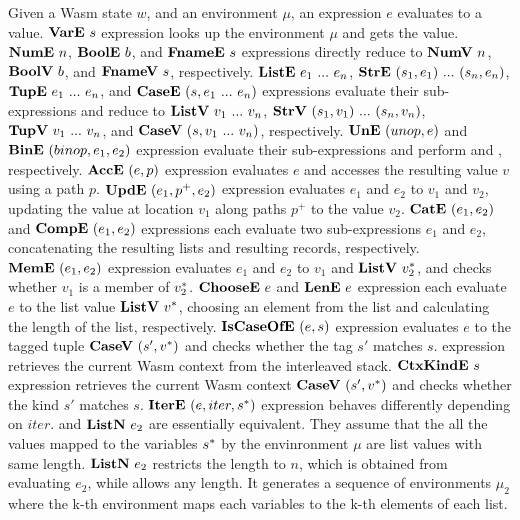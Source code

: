 Given a Wasm state $w$, and an environment $\mu$, an expression $e$ evaluates
to a value.
$\textbf{VarE} ~ s${} expression looks up the environment $\mu$ and gets the value.
$\textbf{NumE} ~ n${}, $\textbf{BoolE} ~ b${}, and $\textbf{FnameE} ~ s${} expressions directly reduce
to $\textbf{NumV} ~ n${}, $\textbf{BoolV} ~ b${}, and $\textbf{FnameV} ~ s${}, respectively.
$\textbf{ListE} ~ e_1 ~ ... ~ e_n${}, $\textbf{StrE} ~ (s_1, e_1) ~ ... ~ (s_n, e_n)${}, $\textbf{TupE}
~ e_1 ~ ... ~ e_n${}, and $\textbf{CaseE} ~ (s, e_1 ~ ... ~ e_n)${} expressions
evaluate their sub-expressions and reduce to $\textbf{ListV} ~ v_1 ~ ... ~ v_n${},
$\textbf{StrV} ~ (s_1, v_1) ~ ... ~ (s_n, v_n)${}, $\textbf{TupV} ~ v_1 ~ ... ~ v_n${}, and
$\textbf{CaseV} ~ (s, v_1 ~ ... ~ v_n)${}, respectively.
$\textbf{UnE} ~ (unop, e)${} and $\textbf{BinE} ~ (binop, e_1, e_2)${} expression evaluate
their sub-expressions and perform \unop{} and \binop{}, respectively.
$\textbf{AccE} ~ (e, p)${} expression evaluates $e$ and accesses the resulting value
$v$ using a path $p$.
$\textbf{UpdE} ~ (e_1, p^+, e_2)${} expression evaluates $e_1$ and $e_2$ to $v_1$ and
$v_2$, updating the value at location $v_1$ along paths $p^+$ to the value
$v_2$.
$\textbf{CatE} ~ (e_1, e_2)${} and $\textbf{CompE} ~ (e_1, e_2)${} expressions each evaluate
two sub-expressions $e_1$ and $e_2$, concatenating the resulting lists and
resulting records, respectively.
$\textbf{MemE} ~ (e_1, e_2)${} expression evaluates $e_1$ and $e_2$ to $v_1$ and
$\textbf{ListV} ~ v^*_2$, and checks whether $v_1$ is a member of $v^*_2$.
$\textbf{ChooseE} ~ e$ and $\textbf{LenE} ~ e${} expression each evaluate $e$ to the list value
$\textbf{ListV} ~ v^*$, choosing an element from the list and calculating the length of the
list, respectively.
$\textbf{IsCaseOfE} ~ (e, s)${} expression evaluates $e$ to the tagged tuple $\textbf{CaseV} ~
(s', v^*)$ and checks whether the tag $s'$ matches $s$.
\getcurctxe{} expression retrieves the current Wasm context from the
interleaved stack.
$\textbf{CtxKindE} ~ s${} expression retrieves the current Wasm context $\textbf{CaseV} ~ (s',
v^*)$ and checks whether the kind $s'$ matches $s$.
$\textbf{IterE} ~ (e, iter, s^*)${} expression behaves differently depending on $iter$.
\listiter{} and $\textbf{ListN} ~ e_2${} are essentially equivalent.
They assume that the all the values mapped to the variables $s^*$ by the
envinronment $\mu${} are list values with same length.
$\textbf{ListN} ~ e_2${} restricts the length to $n$, which is obtained from
evaluating $e_2$, while \listiter{} allows any length.
It generates a sequence of environments $\mu_2$ where the k-th environment maps
each variables to the k-th elements of each list.
